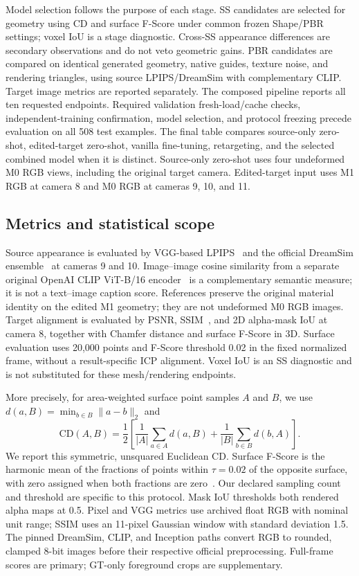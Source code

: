\documentclass[10pt]{article}
\begin{document}
Model selection follows the purpose of each stage. SS candidates are selected
for geometry using CD and surface F-Score under common frozen Shape/PBR
settings; voxel IoU is a stage diagnostic. Cross-SS appearance differences
are secondary observations and do not veto geometric gains. PBR candidates
are compared on identical generated geometry, native guides, texture noise,
and rendering triangles, using source LPIPS/DreamSim with complementary CLIP.
Target image metrics are reported separately. The composed pipeline reports
all ten requested endpoints. Required validation fresh-load/cache checks,
independent-training confirmation, model selection, and protocol freezing
precede evaluation on all 508 test examples. The final table compares
source-only zero-shot, edited-target zero-shot, vanilla fine-tuning,
retargeting, and the selected combined model when it is distinct. Source-only
zero-shot uses four undeformed M0 RGB views, including the original target
camera. Edited-target input uses M1 RGB at camera 8 and M0 RGB at cameras
9, 10, and 11.

\subsection{Metrics and statistical scope}
Source appearance is evaluated by VGG-based LPIPS~\cite{zhang2018lpips} and
the official DreamSim ensemble~\cite{fu2023dreamsim} at cameras 9 and 10.
Image--image cosine similarity from a separate original OpenAI CLIP
ViT-B/16 encoder~\cite{radford2021clip} is a complementary semantic measure;
it is not a text--image caption score. References preserve the
original material identity on the edited M1 geometry; they are not undeformed
M0 RGB images. Target alignment is evaluated by PSNR, SSIM~\cite{wang2004ssim}, and 2D alpha-mask
IoU at camera 8, together with Chamfer distance and surface F-Score in 3D.
Surface evaluation uses 20,000 points and F-Score threshold 0.02 in the fixed
normalized frame, without a result-specific ICP alignment. Voxel IoU is an SS
diagnostic and is not substituted for these mesh/rendering endpoints.

More precisely, for area-weighted surface point samples $A$ and $B$, we use
$d(a,B)=\min_{b\in B}\lVert a-b\rVert_2$ and
\begin{equation}
 \mathrm{CD}(A,B)=\frac12\left[\frac1{|A|}\sum_{a\in A}d(a,B)
 +\frac1{|B|}\sum_{b\in B}d(b,A)\right].
\end{equation}
We report this symmetric, unsquared Euclidean CD. Surface F-Score is the harmonic mean of
the fractions of points within $\tau=0.02$ of the opposite surface, with zero
assigned when both fractions are zero~\cite{tatarchenko2019surface}.
Our declared sampling count and threshold are specific to this protocol.
Mask IoU thresholds both rendered alpha maps at 0.5. Pixel and VGG metrics
use archived float RGB with nominal unit range; SSIM uses an 11-pixel
Gaussian window with standard deviation 1.5. The pinned DreamSim, CLIP, and
Inception paths convert RGB to rounded, clamped 8-bit images before their
respective official preprocessing. Full-frame scores are primary;
GT-only foreground crops are supplementary.
\end{document}
